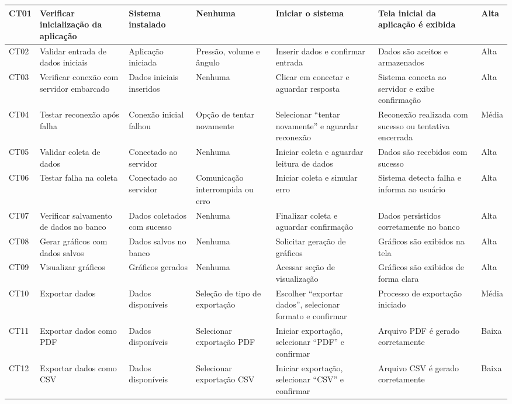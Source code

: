 \begin{longtable}{|p{1cm}|p{2cm}|p{2cm}|p{2.2cm}|p{2cm}|p{2cm}|p{2.1cm}|}
  CT01 & Verificar inicialização da aplicação & Sistema instalado & Nenhuma & Iniciar o sistema & Tela inicial da aplicação é exibida & Alta \\
  \hline
  CT02 & Validar entrada de dados iniciais & Aplicação iniciada & Pressão, volume e ângulo & Inserir dados e confirmar entrada & Dados são aceitos e armazenados & Alta \\
  \hline
  CT03 & Verificar conexão com servidor embarcado & Dados iniciais inseridos & Nenhuma & Clicar em conectar e aguardar resposta & Sistema conecta ao servidor e exibe confirmação & Alta \\
  \hline
  CT04 & Testar reconexão após falha & Conexão inicial falhou & Opção de tentar novamente & Selecionar “tentar novamente” e aguardar reconexão & Reconexão realizada com sucesso ou tentativa encerrada & Média \\
  \hline
  CT05 & Validar coleta de dados & Conectado ao servidor & Nenhuma & Iniciar coleta e aguardar leitura de dados & Dados são recebidos com sucesso & Alta \\
  \hline
  CT06 & Testar falha na coleta & Conectado ao servidor & Comunicação interrompida ou erro & Iniciar coleta e simular erro & Sistema detecta falha e informa ao usuário & Alta \\
  \hline
  CT07 & Verificar salvamento de dados no banco & Dados coletados com sucesso & Nenhuma & Finalizar coleta e aguardar confirmação & Dados persistidos corretamente no banco & Alta \\
  \hline
  CT08 & Gerar gráficos com dados salvos & Dados salvos no banco & Nenhuma & Solicitar geração de gráficos & Gráficos são exibidos na tela & Alta \\
  \hline
  CT09 & Visualizar gráficos & Gráficos gerados & Nenhuma & Acessar seção de visualização & Gráficos são exibidos de forma clara & Alta \\
  \hline
  CT10 & Exportar dados & Dados disponíveis & Seleção de tipo de exportação & Escolher “exportar dados”, selecionar formato e confirmar & Processo de exportação iniciado & Média \\
  \hline
  CT11 & Exportar dados como PDF & Dados disponíveis & Selecionar exportação PDF & Iniciar exportação, selecionar “PDF” e confirmar & Arquivo PDF é gerado corretamente & Baixa \\
  \hline
  CT12 & Exportar dados como CSV & Dados disponíveis & Selecionar exportação CSV & Iniciar exportação, selecionar “CSV” e confirmar & Arquivo CSV é gerado corretamente & Baixa \\
  \hline
  \end{longtable}

